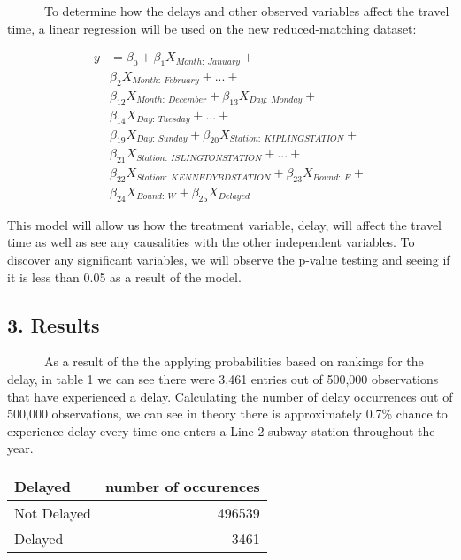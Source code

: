 \documentclass[
]{article}
\begin{document}
~~~~~~To determine how the delays and other observed variables affect
the travel time, a linear regression will be used on the new
reduced-matching dataset:

\begin{align*}
y &= {\beta}_0 + 
                            {\beta}_1X_{Month:\ January} + \\
                        &    {\beta}_2X_{Month:\ February} +
                            ... + \\
                        &    {\beta}_12X_{Month:\ December} + 
                            {\beta}_13X_{Day:\ Monday} + \\
                        &   {\beta}_14X_{Day:\ Tuesday} + 
                            ... + \\
                        &    {\beta}_19X_{Day:\ Sunday} + 
                            {\beta}_20X_{Station:\ KIPLING STATION} + \\
                        &   {\beta}_21X_{Station:\ ISLINGTON STATION} + 
                            ... + \\
                        &    {\beta}_{22}X_{Station:\ KENNEDY BD STATION} + 
                            {\beta}_{23}X_{Bound:\ E} + \\
                        &    {\beta}_{24}X_{Bound:\ W}  + {\beta}_{25}X_{Delayed}
\end{align*}

This model will allow us how the treatment variable, delay, will affect
the travel time as well as see any causalities with the other
independent variables. To discover any significant variables, we will
observe the p-value testing and seeing if it is less than 0.05 as a
result of the model.

\hypertarget{results}{%
\subsection{3. Results}\label{results}}

~~~~~~As a result of the the applying probabilities based on rankings
for the delay, in table 1 we can see there were 3,461 entries out of
500,000 observations that have experienced a delay. Calculating the
number of delay occurrences out of 500,000 observations, we can see in
theory there is approximately 0.7\% chance to experience delay every
time one enters a Line 2 subway station throughout the year.

\begin{table}[H]
\centering
\begin{tabular}{l|r}
\hline
Delayed & number of occurences\\
\hline
Not Delayed & 496539\\
\hline
Delayed & 3461\\
\hline
\end{tabular}
\end{table}
\end{document}
